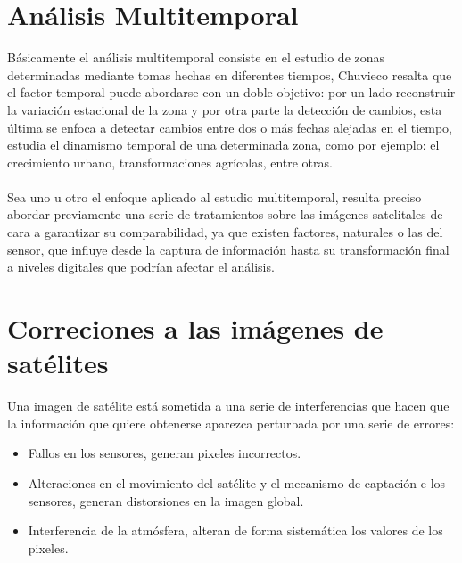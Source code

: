 \section{An\'alisis Multitemporal}
B\'asicamente el an\'alisis multitemporal consiste en el estudio de zonas determinadas mediante tomas hechas en diferentes tiempos, Chuvieco \cite{salinero2002teledeteccion} resalta que el factor temporal puede abordarse con un doble objetivo: por un lado reconstruir la variaci\'on estacional de la zona y por otra parte la detecci\'on de cambios, esta \'ultima se enfoca a detectar cambios entre dos o m\'as
fechas alejadas en el tiempo, estudia el dinamismo temporal de una determinada zona, como por ejemplo: el crecimiento urbano, transformaciones agrícolas, entre otras.\\~\\
Sea uno u otro el enfoque aplicado al estudio multitemporal, resulta preciso abordar previamente una serie de tratamientos sobre las im\'agenes satelitales de cara a garantizar su comparabilidad, ya que existen factores, naturales o las del sensor, que influye desde la captura de informaci\'on hasta su transformaci\'on final a niveles digitales que podr\'ian afectar el an\'alisis.


\section{Correciones a las im\'agenes de sat\'elites}
Una imagen de sat\'elite est\'a sometida a una serie de interferencias que hacen que la informaci\'on que quiere obtenerse aparezca perturbada por una serie de errores:
	\begin{itemize}
		\item Fallos en los sensores, generan pixeles incorrectos.
		\item Alteraciones en el movimiento del sat\'elite y el mecanismo de captaci\'on e los sensores, generan
		distorsiones en la imagen global.
		\item Interferencia de la atm\'osfera, alteran de forma sistem\'atica los valores de los pixeles.
	\end{itemize}


